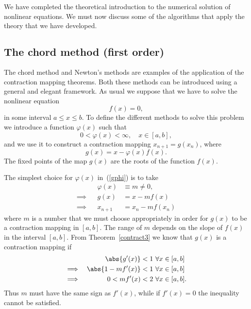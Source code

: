 We  have completed the  theoretical  introduction to the
numerical solution of nonlinear  equations.  We must now discuss  some
of the  algorithms  that apply  the   theory that  we have  developed.

\subsection{The chord method (first order)}

The chord method and Newton's methods are examples of the application
of the contraction mapping theorems.  Both these methods can be
introduced using a general and elegant framework.  As usual we suppose
that we have to solve the nonlinear equation
%
\begin{equation*}
  f(x) = 0,
\end{equation*}
%
in some interval $a \le x \le b$.  To define the different methods to
solve this problem we introduce a function $\varphi(x)$ such that
%
\begin{equation}
  0 < \varphi(x) < \infty, \quad x \in [a,b] ,
 \label{phibound}
\end{equation}
%
and we use it to construct a contraction mapping $x_{n+1} =
g(x_n)$, where
%
\begin{equation}
  g(x) = x - \varphi(x) f(x).   \label{gphi}
\end{equation}
%
The fixed points of the map $g(x)$ are the roots of the function
$f(x)$.

\smallskip

The simplest choice for $\varphi(x)$ in~(\ref{gphi}) is to take
%
\begin{align}
  && \varphi(x) & \equiv m \ne 0, \\
  \implies && g(x) & = x - m f(x) \\
  \implies && x_{n+1} & = x_n - m f(x_n)
  \label{phichord}
\end{align}
%
where $m$ is a number that we must choose appropriately in order for
$g(x)$ to be a contraction mapping in $[a,b]$.   The range of $m$
depends on the slope of $f(x)$ in the interval $[a,b]$.   From
Theorem~\ref{contract3} we know that $g(x)$ is a contraction mapping if
%
\begin{align}
  & &  \abs{ g'(x) } & < 1 \,\,  \forall x \in [a,b] \nonumber
  \\
  \implies &&
  \abs{ 1 - m f'(x) } & < 1 \,\, \forall x \in [a,b] \nonumber
  \\
  \implies && 0 < m f'(x) & < 2 \,\, \forall x \in [a,b] . \label{ineq_chord}
\end{align}
%
Thus $m$ must have the same sign as $f'(x)$, while if $f'(x)=0$ the
inequality cannot be satisfied.

